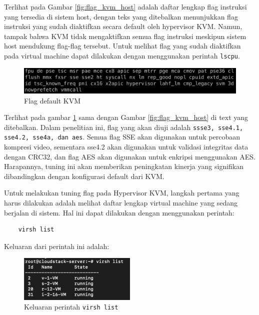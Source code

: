 Terlihat pada Gambar \ref{fig:flag_kvm_host} adalah daftar lengkap flag instruksi yang tersedia di sistem host, dengan teks yang ditebalkan menunjukkan flag instruksi yang sudah diaktifkan secara default oleh hypervisor KVM. Namun, tampak bahwa KVM tidak mengaktifkan semua flag instruksi meskipun sistem host mendukung flag-flag tersebut. Untuk melihat flag yang sudah diaktifkan pada virtual machine dapat dilakukan dengan menggunakan perintah \texttt{lscpu}.


\begin{figure}
    \centering
    \includegraphics[width=1\textwidth]
    {assets/pics/lscpu_original.jpeg}
    \caption{Flag default KVM}
    \label{fig:lscpu_original}
\end{figure}

Terlihat pada gambar \ref{fig:lscpu_original} sama dengan Gambar \ref{fig:flag_kvm_host} di text yang ditebalkan. Dalam penelitian ini, flag yang akan diuji adalah \texttt{ssse3, sse4.1, sse4.2, sse4a, dan aes}. Semua flag SSE akan digunakan untuk percobaan kompresi video, sementara sse4.2 akan digunakan untuk validasi integritas data dengan CRC32, dan flag AES akan digunakan untuk enkripsi menggunakan AES. Harapannya, tuning ini akan memberikan peningkatan kinerja yang signifikan dibandingkan dengan konfigurasi default dari KVM.

Untuk melakukan tuning flag pada Hypervisor KVM, langkah pertama yang harus dilakukan adalah melihat daftar lengkap virtual machine yang sedang berjalan di sistem. Hal ini dapat dilakukan dengan menggunakan perintah:

\begin{lstlisting}
    virsh list
\end{lstlisting}

Keluaran dari perintah ini adalah:
\begin{figure}
    \centering
    \includegraphics[width=0.5\textwidth]
    {assets/pics/virsh_list.png}
    \caption{Keluaran perintah \texttt{virsh list}}
    \label{fig:virsh_list}
\end{figure}

